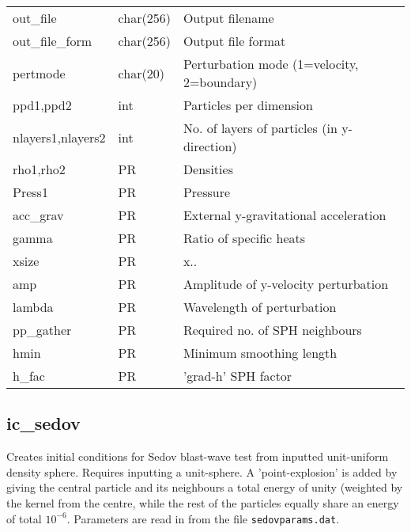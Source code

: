 \documentclass[a4paper]{article}
\newcommand{\var}[1]{\texttt{#1}}
\begin{document}
\begin{center}
\begin{supertabular}{|p{3cm}|p{2cm}|p{8cm}|}
out\_file         & char(256) & Output filename \\
out\_file\_form   & char(256) & Output file format \\
pertmode          & char(20)  & Perturbation mode (1=velocity, 2=boundary) \\
ppd1,ppd2         & int       & Particles per dimension \\
nlayers1,nlayers2 & int       & No. of layers of particles (in y-direction) \\
rho1,rho2         & PR        & Densities \\
Press1            & PR        & Pressure \\
acc\_grav         & PR        & External y-gravitational acceleration \\      
gamma             & PR        & Ratio of specific heats \\
xsize             & PR        & x.. \\
amp               & PR        & Amplitude of y-velocity perturbation \\
lambda            & PR        & Wavelength of perturbation \\
pp\_gather        & PR        & Required no. of SPH neighbours \\
hmin              & PR        & Minimum smoothing length \\
h\_fac            & PR        & 'grad-h' SPH factor \\
\end{supertabular}
\end{center}

\newpage


\subsection{ic\_sedov}
Creates initial conditions for Sedov blast-wave test from inputted unit-uniform density sphere.  Requires inputting a unit-sphere.  A 'point-explosion' is added by giving the central particle and its neighbours a total energy of unity (weighted by the kernel from the centre, while the rest of the particles equally share an energy of total $10^{-6}$.  Parameters are read in from the file \var{sedovparams.dat}. \newline
\end{document}
